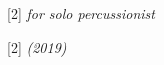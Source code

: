 \documentclass{article}
\begin{document}
\begin{titlepage}
        \vfill

        {
            \scalebox{1}[2]
            {\fontsize{0.5cm}{1em}\selectfont \itshape for solo percussionist}
        }

        \vspace*{1\baselineskip}

        {
            \scalebox{1}[2]
            {\fontsize{0.5cm}{1em}\selectfont \itshape (2019)}
        }

        \vspace*{2\baselineskip}

    \end{titlepage}
\end{document}
